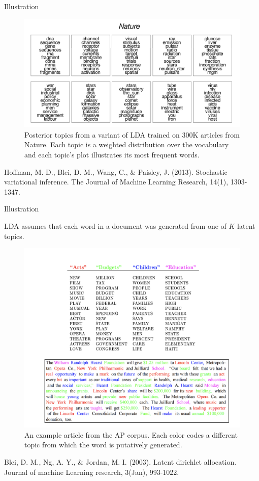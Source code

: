 \documentclass[10pt]{beamer}
\newcommand{\+}[1]{\ensuremath{{\boldsymbol #1}}} %
\begin{document}
\begin{frame}{Illustration}
  
\begin{figure}
\includegraphics[width=\textwidth]{images/lda_topics_nature}
\caption{ Posterior topics from a variant of LDA trained on 300K articles from Nature.  Each topic is a weighted distribution over the vocabulary and each topic’s plot illustrates its most frequent words.}
\end{figure}

\vfill

\tiny Hoffman, M. D., Blei, D. M., Wang, C., \& Paisley, J. (2013). Stochastic variational inference. The Journal of Machine Learning Research, 14(1), 1303-1347.
  
\end{frame}



\begin{frame}{Illustration}

LDA assumes that each word in a document was generated from one of $K$ latent topics.
  
\begin{figure}
\includegraphics[width=.8\textwidth]{images/lda_word_colors}
\caption{ An example article from the AP corpus. Each color codes a different topic from which the word is putatively generated.}
\end{figure}

\vfill

\tiny Blei, D. M., Ng, A. Y., \& Jordan, M. I. (2003). Latent dirichlet allocation. Journal of machine Learning research, 3(Jan), 993-1022.
  
\end{frame}
\end{document}
